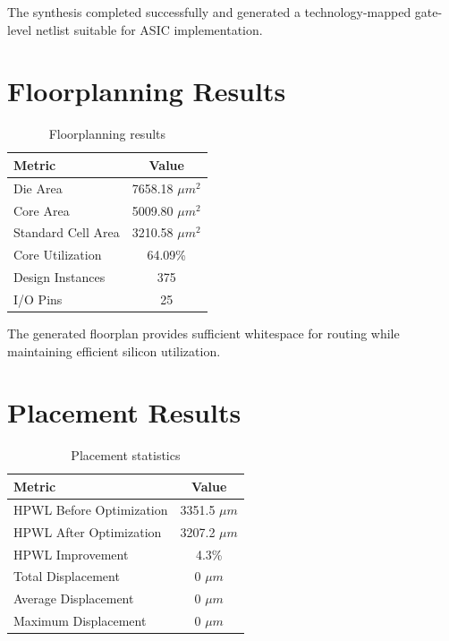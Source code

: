 The synthesis completed successfully and generated a technology-mapped gate-level netlist suitable for ASIC implementation.


\section{Floorplanning Results}

\begin{table}[!htbp]
\centering
\caption{Floorplanning results}
\label{tab:floorplan_result}
\begin{tabular}{lc}
\toprule
Metric & Value\\
\midrule
Die Area & 7658.18 $\mu m^2$\\
Core Area & 5009.80 $\mu m^2$\\
Standard Cell Area & 3210.58 $\mu m^2$\\
Core Utilization & 64.09\%\\
Design Instances & 375\\
I/O Pins & 25\\
\bottomrule
\end{tabular}
\end{table}

The generated floorplan provides sufficient whitespace for routing while maintaining efficient silicon utilization.


\section{Placement Results}

\begin{table}[!htbp]
\centering
\caption{Placement statistics}
\label{tab:placement_result}
\begin{tabular}{lc}
\toprule
Metric & Value\\
\midrule
HPWL Before Optimization & 3351.5 $\mu m$\\
HPWL After Optimization & 3207.2 $\mu m$\\
HPWL Improvement & 4.3\%\\
Total Displacement & 0 $\mu m$\\
Average Displacement & 0 $\mu m$\\
Maximum Displacement & 0 $\mu m$\\
\bottomrule
\end{tabular}
\end{table}

